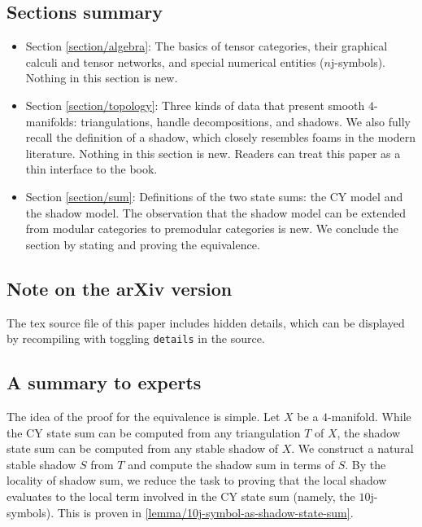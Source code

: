 \subsection{Sections summary}

\begin{itemize}
  \item Section \ref{section/algebra}: The basics of tensor
        categories, their graphical calculi and tensor networks,
        and special numerical entities ($n$j-symbols). Nothing in
        this section is new.
  \item Section \ref{section/topology}: Three kinds of data that
        present smooth $4$-manifolds: triangulations, handle
        decompositions, and shadows. We also fully recall the
        definition of a shadow, which closely resembles foams in
        the modern literature. Nothing in this section is new.
        Readers can treat this paper as a thin interface to the
        book.
  \item Section \ref{section/sum}: Definitions of the two state
        sums: the CY model and the shadow model. The observation
        that the shadow model can be extended from modular
        categories to premodular categories is new. We conclude
        the section by stating and proving the equivalence.
\end{itemize}

\subsection{Note on the arXiv version}
The tex source file of this paper includes hidden details, which
can be displayed by recompiling with toggling \texttt{details} in
the source.

\subsection{A summary to experts}\label{subsection/a-summary-to-experts}

The idea of the proof for the equivalence is simple. Let $X$ be a
$4$-manifold. While the CY state sum can be computed from any
triangulation $T$ of $X$, the shadow state sum can be computed
from any stable shadow of $X$. We construct a natural stable
shadow $S$ from $T$ and compute the shadow sum in terms of $S$.
By the locality of shadow sum, we reduce the task to proving that
the local shadow evaluates to the local term involved in the CY
state sum (namely, the $10$j-symbols). This is proven in
\ref{lemma/10j-symbol-as-shadow-state-sum}.

